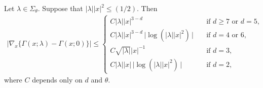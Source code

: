 \begin{thm}
  \label{thm:differenceFundamentalSolutionStokes}
  Let $\lambda \in \Sigma_\theta$.
  Suppose that $|\lambda| |x|^2 \leq ({1}/{2})$.
  Then
  \begin{align}
    \big|\nabla_x \{ \Gamma(x; \lambda) - \Gamma(x; 0) \} \big|
    \leq 
    \begin{cases}
      C |\lambda| |x|^{3 - d} &\quad\text{if } d \geq 7 \text{ or } d = 5, \\
      C |\lambda| |x|^{3 - d} \, \big| \log(|\lambda| |x|^2)\, \big| &\quad\text{if } d = 4 \text{ or } 6, \\
      C \sqrt{|\lambda|} |x|^{-1} &\quad\text{if } d = 3,\\
      C |\lambda| |x| \, \big|\log(|\lambda| |x|^2)\,\big|  &\quad\text{if } d = 2,
    \end{cases}
  \end{align}
  where $C$ depends only on $d$ and $\theta$.
\end{thm}

